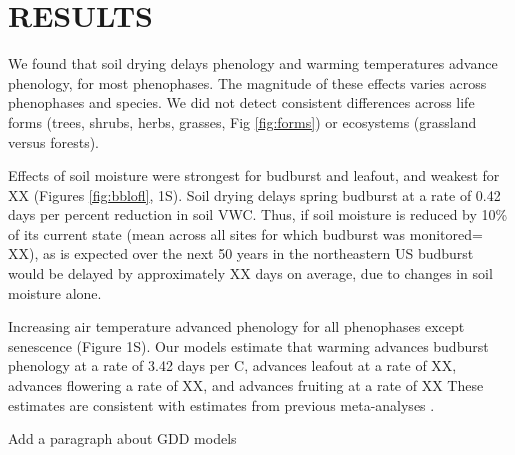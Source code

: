 \documentclass{article}
\begin{document}
\section* {RESULTS}
We found that soil drying delays phenology and warming temperatures advance phenology, for most phenophases. The magnitude of these effects varies across phenophases and species. We did not detect consistent differences across life forms (trees, shrubs, herbs, grasses, Fig \ref{fig:forms}) or ecosystems (grassland versus forests).
\par Effects of soil moisture were strongest for budburst and leafout, and weakest for XX (Figures \ref{fig:bblofl}, 1S). Soil drying delays spring budburst at a rate of 0.42 days per percent reduction in soil VWC. Thus, if soil moisture is reduced by 10\% of its current state (mean across all sites for which budburst was monitored= XX), as is expected over the next 50 years in the northeastern US \citep{berg2017} budburst would be delayed by approximately XX days on average, due to changes in soil moisture alone.

\par  Increasing air temperature advanced phenology for all phenophases except senescence (Figure 1S). Our models estimate that warming advances budburst phenology at a rate of 3.42 days per \degree C, advances leafout at a rate of XX, advances flowering a rate of XX, and advances fruiting at a rate of XX These estimates are consistent with estimates from previous meta-analyses \citep{wolkovich2012}. 

\par  Add a paragraph about GDD models

\end{document}
